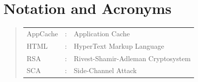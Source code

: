 \documentclass[10pt,a4paper,twoside]{book}
\begin{document}

\chapter*{Notation and Acronyms}




\begin{quote}
\noindent
\begin{tabular}{lcl}

AppCache		    &:	   & Application Cache   												  \\	
HTML				&:     & HyperText Markup Language											  \\
RSA					&:	   & Rivest-Shamir-Adleman Cryptosystem									  \\
SCA					&:	   & Side-Channel Attack												  \\	
\end{tabular}
\end{quote}
\end{document}

